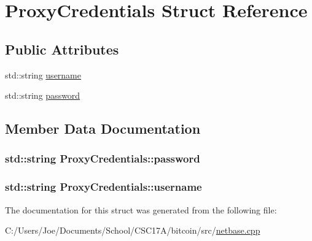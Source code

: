 \hypertarget{struct_proxy_credentials}{}\section{Proxy\+Credentials Struct Reference}
\label{struct_proxy_credentials}
\subsection*{Public Attributes}
\begin{DoxyCompactItemize}
\item 
std\+::string \hyperlink{struct_proxy_credentials_a1b5e426884ddec6a55c60561c1e85c6a}{username}
\item 
std\+::string \hyperlink{struct_proxy_credentials_a380630fa3a709e51f7a692e757c876d7}{password}
\end{DoxyCompactItemize}


\subsection{Member Data Documentation}
\hypertarget{struct_proxy_credentials_a380630fa3a709e51f7a692e757c876d7}{}
\subsubsection[{password}]{\setlength{\rightskip}{0pt plus 5cm}std\+::string Proxy\+Credentials\+::password}\label{struct_proxy_credentials_a380630fa3a709e51f7a692e757c876d7}
\hypertarget{struct_proxy_credentials_a1b5e426884ddec6a55c60561c1e85c6a}{}
\subsubsection[{username}]{\setlength{\rightskip}{0pt plus 5cm}std\+::string Proxy\+Credentials\+::username}\label{struct_proxy_credentials_a1b5e426884ddec6a55c60561c1e85c6a}


The documentation for this struct was generated from the following file\+:\begin{DoxyCompactItemize}
\item 
C\+:/\+Users/\+Joe/\+Documents/\+School/\+C\+S\+C17\+A/bitcoin/src/\hyperlink{netbase_8cpp}{netbase.\+cpp}\end{DoxyCompactItemize}
